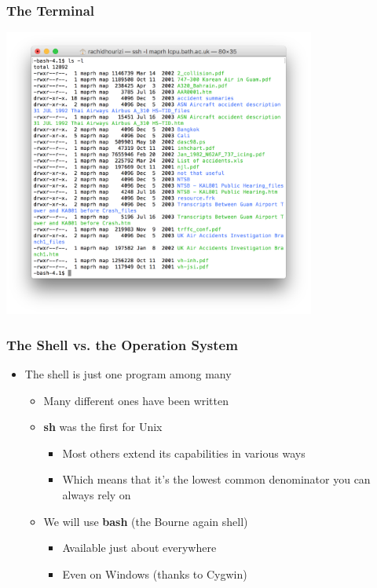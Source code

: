 \documentclass{beamer}
\begin{document}
\begin{frame}\frametitle{The Terminal}
\includegraphics[height=9.5cm,keepaspectratio]{terminal}
\end{frame}

\begin{frame}\frametitle{The Shell vs. the Operation System}
\begin{itemize}
\item The shell is just one program among many
\begin{itemize}
    \item Many different ones have been written
    \item \textbf{sh} was the first for Unix
	\begin{itemize}
          \item Most others extend its capabilities in various ways
          \item Which means that it's the lowest common denominator you can always rely on
	\end{itemize}
    \item We will use \textbf{bash} (the Bourne again shell)
\begin{itemize}
          \item Available just about everywhere
          \item Even on Windows (thanks to Cygwin)
\end{itemize}
\end{itemize}
\end{itemize}
\end{frame}
\end{document}
